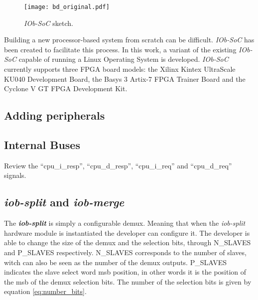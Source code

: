 \begin{figure}[!h]
    \centering
    \texttt{[image: bd\_original.pdf]}
    \caption{\textit{IOb-SoC} sketch.}
    \label{fig:bd_original}
\end{figure}

Building a new processor-based system from scratch can be difficult. \textit{IOb-SoC} has been created to facilitate this process. In this work, a variant of the existing \textit{IOb-SoC} capable of running a Linux Operating System is developed. \textit{IOb-SoC} currently supports three FPGA board models: the Xilinx Kintex UltraScale KU040 Development Board, the Basys 3 Artix-7 FPGA Trainer Board and the Cyclone V GT FPGA Development Kit.

\subsection{Adding peripherals}
\subsection{Internal Buses}
Review the \enquote{cpu\_i\_resp}, \enquote{cpu\_d\_resp}, \enquote{cpu\_i\_req} and \enquote{cpu\_d\_req} signals.

\subsection{\textit{iob-split} and \textit{iob-merge}}
The \textbf{\textit{iob-split}} is simply a configurable \acrfull{demux}. Meaning that when the \textit{iob-split} hardware module is instantiated the developer can configure it. The developer is able to change the size of the \acrlong{demux} and the selection bits, through N\_SLAVES and P\_SLAVES respectively. N\_SLAVES corresponds to the number of slaves, witch can also be seen as the number of the \acrshort{demux} outputs. P\_SLAVES indicates the slave select word \acrfull{msb} position, in other words it is the position of the \acrshort{msb} of the \acrlong{demux} selection bits. The number of the selection bits is given by equation \ref{eq:number_bits}.

